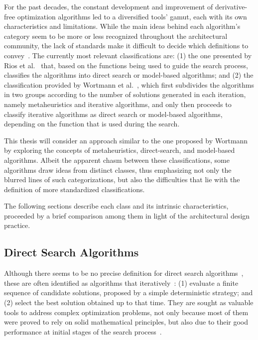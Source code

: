 	For the past decades, the constant development and improvement of derivative-free optimization algorithms led to a diversified tools' gamut, each with its own characteristics and limitations. While the main ideas behind each algorithm's category seem to be more or less recognized throughout the architectural community, the lack of standards make it difficult to decide which definitions to convey~\cite{Rios2013, Wortmann2017ADO}. The currently most relevant classifications are: (1) the one presented by Rios et al.~\cite{Rios2013} that, based on the functions being used to guide the search process, classifies the algorithms into direct search or model-based algorithms; and (2) the classification provided by Wortmann et al.~\cite{Wortmann2017ADO}, which first subdivides the algorithms in two groups according to the number of solutions generated in each iteration, namely metaheuristics and iterative algorithms, and only then proceeds to classify iterative algorithms as direct search or model-based algorithms, depending on the function that is used during the search. 

	This thesis will consider an approach similar to the one proposed by Wortmann~\cite{Wortmann2017ADO} by exploring the concepts of metaheuristics, direct-search, and model-based algorithms. Albeit the apparent chasm between these classifications, some algorithms draw ideas from distinct classes, thus emphasizing not only the blurred lines of such categorizations, but also the difficulties that lie with the definition of more standardized classifications. 
	
	The following sections describe each class and its intrinsic characteristics, proceeded by a brief comparison among them in light of the architectural design practice. 	

\subsection{Direct Search Algorithms}
\label{ssec:direct-search}

	Although there seems to be no precise definition for direct search algorithms~\cite{Kolda2003}, these are often identified as algorithms that iteratively~\cite{Kolda2003,Wortmann2016BBO}: (1) evaluate a finite sequence of candidate solutions, proposed by a simple deterministic strategy; and (2) select the best solution obtained up to that time. They are sought as valuable tools to address complex optimization problems, not only because most of them were proved to rely on solid mathematical principles, but also due to their good performance at initial stages of the search process~\cite{Rios2013, Wortmann2016BBO}. 
	
